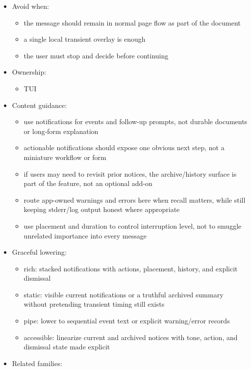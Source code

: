 \begin{itemize}
  \begin{itemize}
  \tightlist
  \item
    the app owns transient messaging as a system instead of rendering one ad hoc overlay at a time
  \item
    stacking, placement, routing, or history matter
  \item
    warnings and errors should be reviewable after the moment they first appear
  \end{itemize}
\item
  Avoid when:

  \begin{itemize}
  \tightlist
  \item
    the message should remain in normal page flow as part of the document
  \item
    a single local transient overlay is enough
  \item
    the user must stop and decide before continuing
  \end{itemize}
\item
  Ownership:

  \begin{itemize}
  \tightlist
  \item
    TUI
  \end{itemize}
\item
  Content guidance:

  \begin{itemize}
  \tightlist
  \item
    use notifications for events and follow-up prompts, not durable documents or long-form explanation
  \item
    actionable notifications should expose one obvious next step, not a miniature workflow or form
  \item
    if users may need to revisit prior notices, the archive/history surface is part of the feature, not an optional add-on
  \item
    route app-owned warnings and errors here when recall matters, while still keeping stderr/log output honest where appropriate
  \item
    use placement and duration to control interruption level, not to smuggle unrelated importance into every message
  \end{itemize}
\item
  Graceful lowering:

  \begin{itemize}
  \tightlist
  \item
    rich: stacked notifications with actions, placement, history, and explicit dismissal
  \item
    static: visible current notifications or a truthful archived summary without pretending transient timing still exists
  \item
    pipe: lower to sequential event text or explicit warning/error records
  \item
    accessible: linearize current and archived notices with tone, action, and dismissal state made explicit
  \end{itemize}
\item
  Related families:


\end{itemize}
